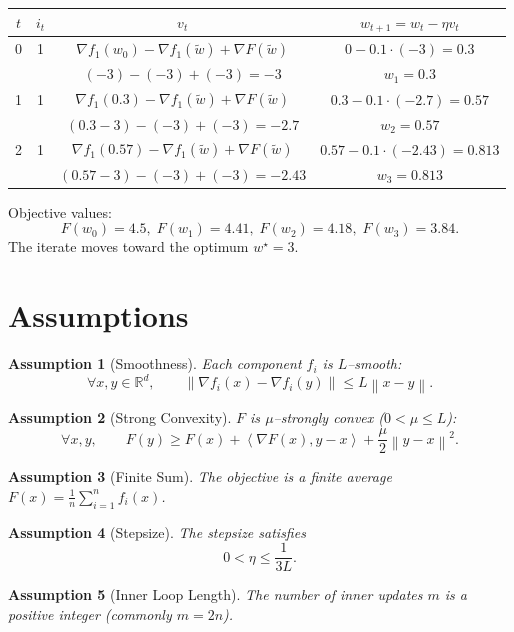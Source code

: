 \documentclass{article}
\newtheorem{assumption}{Assumption}
\newcommand{\norm}[1]{\left\|#1\right\|}
\newcommand{\inner}[2]{\left\langle #1,#2\right\rangle}
\begin{document}
\begin{center}
\begin{tabular}{c|c|c|c}
$t$ & $i_t$ & $v_t$ & $w_{t+1}=w_t-\eta v_t$ \\ \hline
0 & 1 & $\nabla f_1(w_0)-\nabla f_1(\tilde w)+\nabla F(\tilde w)$ 
   & $0-0.1\cdot(-3)=0.3$ \\[2mm]
  &   & $(-3)-(-3)+(-3)= -3$ & $w_1=0.3$ \\ \hline
1 & 1 & $\nabla f_1(0.3)-\nabla f_1(\tilde w)+\nabla F(\tilde w)$ 
   & $0.3-0.1\cdot(-2.7)=0.57$ \\[2mm]
  &   & $(0.3-3)-(-3)+(-3)= -2.7$ & $w_2=0.57$ \\ \hline
2 & 1 & $\nabla f_1(0.57)-\nabla f_1(\tilde w)+\nabla F(\tilde w)$ 
   & $0.57-0.1\cdot(-2.43)=0.813$ \\[2mm]
  &   & $(0.57-3)-(-3)+(-3)= -2.43$ & $w_3=0.813$ 
\end{tabular}
\end{center}
Objective values:
\[
F(w_0)=4.5,\;F(w_1)=4.41,\;F(w_2)=4.18,\;F(w_3)=3.84.
\]
The iterate moves toward the optimum $w^\star=3$.

\newpage

\section*{Assumptions}
\begin{assumption}[Smoothness]\label{as:smooth}
Each component $f_i$ is $L$–smooth:
\[
\forall x,y\in\mathbb{R}^d,\qquad
\norm{\nabla f_i(x)-\nabla f_i(y)}\le L\norm{x-y}.
\]
\end{assumption}
\begin{assumption}[Strong Convexity]\label{as:strong}
$F$ is $\mu$–strongly convex ($0<\mu\le L$):
\[
\forall x,y,\qquad
F(y)\ge F(x)+\inner{\nabla F(x)}{y-x}+\frac{\mu}{2}\norm{y-x}^2 .
\]
\end{assumption}
\begin{assumption}[Finite Sum]\label{as:finite}
The objective is a finite average $F(x)=\frac1n\sum_{i=1}^n f_i(x)$.
\end{assumption}
\begin{assumption}[Stepsize]\label{as:stepsize}
The stepsize satisfies
\[
0<\eta\le \frac{1}{3L}.
\]
\end{assumption}
\begin{assumption}[Inner Loop Length]\label{as:inner}
The number of inner updates $m$ is a positive integer (commonly $m=2n$).
\end{assumption}
\end{document}
